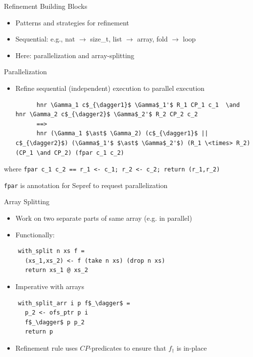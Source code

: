 \documentclass[fleqn]{beamer}
\begin{document}
\begin{frame}{Refinement Building Blocks}
  \begin{itemize}
   \item<+-> Patterns and strategies for refinement
   \item<+-> Sequential: e.g., nat $\to$ size\_t, list $\to$ array, fold $\to$ loop
   \item<+-> Here: parallelization and array-splitting

  \end{itemize}
\end{frame}
\begin{frame}[fragile]{Parallelization}
  \begin{itemize}
   \item Refine sequential (independent) execution to parallel execution
    \small
    \begin{lstlisting}
      hnr \Gamma_1 c$_{\dagger1}$ \Gamma$_1'$ R_1 CP_1 c_1  \and   hnr \Gamma_2 c$_{\dagger2}$ \Gamma$_2'$ R_2 CP_2 c_2
      ==>
      hnr (\Gamma_1 $\ast$ \Gamma_2) (c$_{\dagger1}$ || c$_{\dagger2}$) (\Gamma$_1'$ $\ast$ \Gamma$_2'$) (R_1 \<times> R_2) (CP_1 \and CP_2) (fpar c_1 c_2)
    \end{lstlisting}

  \end{itemize}
  where
    \lstinline{fpar c_1 c_2 == r_1 <- c_1; r_2 <- c_2; return (r_1,r_2)}

    \lstinline{fpar} is annotation for Sepref to request parallelization

\end{frame}
\begin{frame}[fragile]{Array Splitting}
  \begin{itemize}
   \item Work on two separate parts of same array (e.g. in parallel)

   \item Functionally:
  \end{itemize}
  \begin{lstlisting}
    with_split n xs f =
      (xs_1,xs_2) <- f (take n xs) (drop n xs)
      return xs_1 @ xs_2
  \end{lstlisting}

  \begin{itemize}
   \item Imperative with arrays
  \end{itemize}
  \begin{lstlisting}
    with_split_arr i p f$_\dagger$ =
      p_2 <- ofs_ptr p i
      f$_\dagger$ p p_2
      return p
  \end{lstlisting}

  \begin{itemize}
   \item Refinement rule uses $CP$-predicates to ensure that $f_\dagger$ is in-place

  \end{itemize}
\end{frame}
\end{document}

